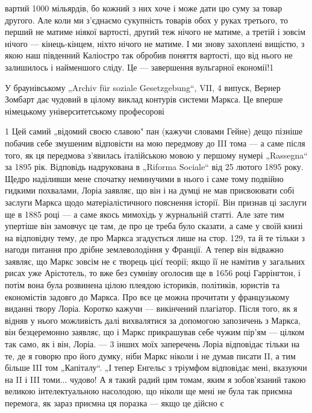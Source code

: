 \parcont{}  %
вартий 1000 мільярдів, бо кожний з них хоче і може дати цю суму за товар другого. Але коли ми з'єднаємо сукупність товарів
обох у руках третього, то перший не матиме ніякої вартості, другий теж нічого не матиме, а третій і зовсім нічого — кінець-кінцем, ніхто
нічого не матиме. І ми знову захоплені вищістю, з якою наш південний Каліостро так обробив поняття вартості,
що від нього не залишилось і найменшого сліду. Це — завершення вульгарної економії!1

У браунівському „Archiv für soziale Gesetzgebung“, VII, 4 випуск, Вернер Зомбарт дає чудовий в цілому виклад контурів
системи Маркса. Це вперше німецькому університетському професорові

1 Цей самий „відомий своєю славою" пан (кажучи словами Гейне) дещо пізніше побачив себе змушеним відповісти на мою передмову
до III тома — а саме після того, як ця передмова з’явилась італійською мовою у першому нумері „Rassegna“ за 1895 рік.
Відповідь надрукована в „Riforma Sociale“ від 25 лютого 1895 року. Щедро наділивши мене спочатку неминучими в нього і саме
тому подвійно гидкими похвалами, Лоріа заявляє, що він і на думці не мав присвоювати собі заслуги Маркса щодо
матеріалістичного пояснення історії. Він признав ці заслуги ще в 1885 році — а саме якось мимохідь у журнальній статті. Але
зате тим упертіше він замовчує це там, де про це треба було сказати, а саме у своїй книзі на відповідну тему, де про Маркса
згадується лише на стор. 129, та й те тільки з нагоди питання про дрібне землеволодіння у Франції. А тепер він відважно
заявляє, що Маркс зовсім не є творець цієї теорії; якщо її не намітив у загальних рисах уже Арістотель, то вже без сумніву
оголосив ще в 1656 році Гаррінгтон, і потім вона була розвинена цілою плеядою істориків, політиків, юристів та економістів
задовго до Маркса. Про все це можна прочитати у французькому виданні твору Лоріа. Коротко кажучи — викінчений плагіатор.
Після того, як я відняв у нього можливість далі вихвалятися за допомогою запозичень з Маркса, він безцеремонно заявляє, що і
Маркс прикрашував себе чужим пір’ям — цілком так само, як і він, Лоріа. — 3 інших моїх заперечень Лоріа відповідає тільки на
те, де я говорю про його думку, ніби Маркс ніколи і не думав писати II, а тим більше III том „Капіталу“. „І тепер Енгельс з
тріумфом відповідає мені, вказуючи на II і III томи... чудово! А я такий радий цим томам, яким я зобов’язаний такою великою
інтелектуальною насолодою, що ніколи ще мені не була так приємна перемога, як зараз приємна ця поразка — якщо це дійсно є
